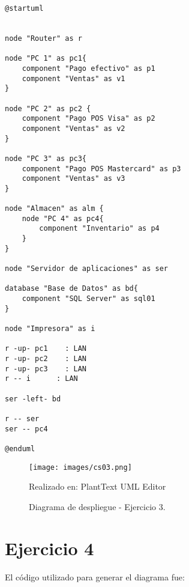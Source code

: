 \documentclass[a4paper,12pt]{article}
\begin{document}
\begin{lstlisting}
@startuml


node "Router" as r

node "PC 1" as pc1{
    component "Pago efectivo" as p1
    component "Ventas" as v1
}

node "PC 2" as pc2 {
    component "Pago POS Visa" as p2
    component "Ventas" as v2
}

node "PC 3" as pc3{
    component "Pago POS Mastercard" as p3
    component "Ventas" as v3
}

node "Almacen" as alm {
    node "PC 4" as pc4{
        component "Inventario" as p4
    }
}

node "Servidor de aplicaciones" as ser 

database "Base de Datos" as bd{
    component "SQL Server" as sql01
}

node "Impresora" as i

r -up- pc1    : LAN
r -up- pc2    : LAN
r -up- pc3    : LAN
r -- i      : LAN

ser -left- bd

r -- ser
ser -- pc4

@enduml
\end{lstlisting}

\clearpage
\newpage

\begin{figure}[ht]
        \centering        
        \texttt{[image: images/cs03.png]}
        \caption{Diagrama de despliegue - Ejercicio 3.}  
        {{\footnotesize Realizado en: PlantText UML Editor }}
\end{figure}

\section*{Ejercicio 4}

El código utilizado para generar el diagrama fue:
\end{document}

